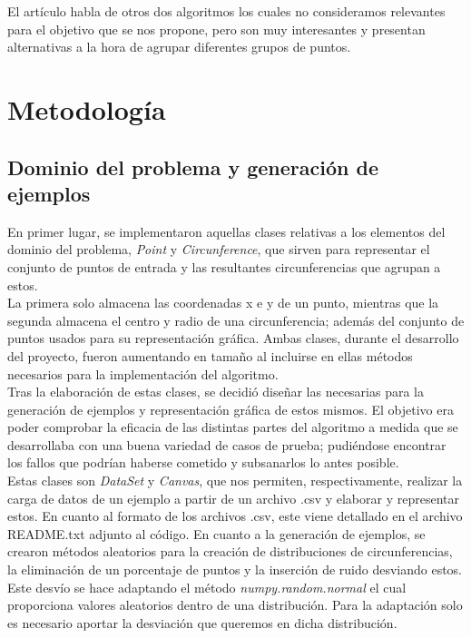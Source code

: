 \documentclass[conference,a4paper]{IEEEtran}
\begin{document}
El artículo habla de otros dos algoritmos los cuales no consideramos relevantes para el objetivo que se nos propone, pero son muy interesantes y presentan alternativas a la hora de agrupar diferentes grupos de puntos.\\

\section{Metodología}

\subsection{Dominio del problema y generación de ejemplos}

En primer lugar, se implementaron aquellas clases relativas a los elementos del dominio del problema, \textit{Point} y \textit{Circunference}, que sirven para representar el conjunto de puntos de entrada y las resultantes circunferencias que agrupan a estos.\\

La primera solo almacena las coordenadas x e y de un punto, mientras que la segunda almacena el centro y radio de una circunferencia; además del conjunto de puntos usados para su representación gráfica. Ambas clases, durante el desarrollo del proyecto, fueron aumentando en tamaño al incluirse en ellas métodos necesarios para la implementación del algoritmo.\\

Tras la elaboración de estas clases, se decidió diseñar las necesarias para la generación de ejemplos y representación gráfica de estos mismos. El objetivo era poder comprobar la eficacia de las distintas partes del algoritmo a medida que se desarrollaba con una buena variedad de casos de prueba; pudiéndose encontrar los fallos que podrían haberse cometido y subsanarlos lo antes posible.\\

Estas clases son \textit{DataSet} y  \textit{Canvas}, que nos permiten, respectivamente, realizar la carga de datos de un ejemplo a partir de un archivo .csv y elaborar y representar estos. En cuanto al formato de los archivos .csv, este viene detallado en el archivo README.txt adjunto al código. En cuanto a la generación de ejemplos, se crearon métodos aleatorios para la creación de distribuciones de circunferencias, la eliminación de un porcentaje de puntos y la inserción de ruido desviando estos. Este desvío se hace adaptando el método \textit{numpy.random.normal} el cual proporciona valores aleatorios dentro de una distribución. Para la adaptación solo es necesario aportar la desviación que queremos en dicha distribución.\\
\end{document}
